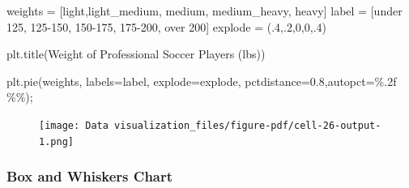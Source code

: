 \documentclass[
  letterpaper,
  DIV=11,
  numbers=noendperiod]{scrreprt}
\newenvironment{Shaded}{\begin{snugshade}}{\end{snugshade}}
\newcommand{\DecValTok}[1]{\textcolor[rgb]{0.68,0.00,0.00}{#1}}
\newcommand{\FloatTok}[1]{\textcolor[rgb]{0.68,0.00,0.00}{#1}}
\newcommand{\NormalTok}[1]{\textcolor[rgb]{0.00,0.23,0.31}{#1}}
\newcommand{\OperatorTok}[1]{\textcolor[rgb]{0.37,0.37,0.37}{#1}}
\newcommand{\SpecialCharTok}[1]{\textcolor[rgb]{0.37,0.37,0.37}{#1}}
\newcommand{\StringTok}[1]{\textcolor[rgb]{0.13,0.47,0.30}{#1}}
\begin{document}
\begin{Shaded}
\begin{Highlighting}[]
\NormalTok{weights }\OperatorTok{=}\NormalTok{ [light,light\_medium, medium, medium\_heavy, heavy]}
\NormalTok{label }\OperatorTok{=}\NormalTok{ [}\StringTok{\textquotesingle{}under 125\textquotesingle{}}\NormalTok{, }\StringTok{\textquotesingle{}125{-}150\textquotesingle{}}\NormalTok{, }\StringTok{\textquotesingle{}150{-}175\textquotesingle{}}\NormalTok{, }\StringTok{\textquotesingle{}175{-}200\textquotesingle{}}\NormalTok{, }\StringTok{\textquotesingle{}over 200\textquotesingle{}}\NormalTok{]}
\NormalTok{explode }\OperatorTok{=}\NormalTok{ (}\FloatTok{.4}\NormalTok{,}\FloatTok{.2}\NormalTok{,}\DecValTok{0}\NormalTok{,}\DecValTok{0}\NormalTok{,}\FloatTok{.4}\NormalTok{)}

\NormalTok{plt.title(}\StringTok{\textquotesingle{}Weight of Professional Soccer Players (lbs)\textquotesingle{}}\NormalTok{)}

\NormalTok{plt.pie(weights, labels}\OperatorTok{=}\NormalTok{label, explode}\OperatorTok{=}\NormalTok{explode, pctdistance}\OperatorTok{=}\FloatTok{0.8}\NormalTok{,autopct}\OperatorTok{=}\StringTok{\textquotesingle{}}\SpecialCharTok{\%.2f}\StringTok{ }\SpecialCharTok{\%\%}\StringTok{\textquotesingle{}}\NormalTok{)}\OperatorTok{;}
\end{Highlighting}
\end{Shaded}

\begin{figure}[H]

{\centering \texttt{[image: Data visualization\_files/figure-pdf/cell-26-output-1.png]}

}

\end{figure}

\hypertarget{box-and-whiskers-chart}{%
\subsubsection{Box and Whiskers Chart}\label{box-and-whiskers-chart}}
\end{document}
